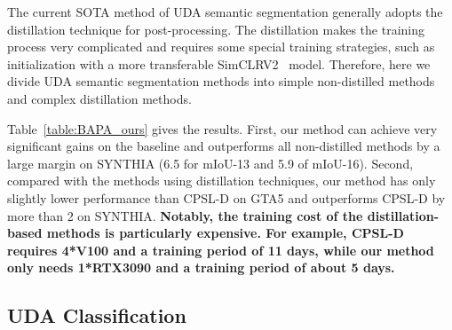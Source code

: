 The current SOTA method of UDA semantic segmentation generally adopts the distillation technique for post-processing. The distillation makes the training process very complicated and requires some special training strategies, such as initialization with a more transferable SimCLRV2~\cite{chen2020big} model. Therefore, here we divide UDA semantic segmentation methods into simple non-distilled methods and complex distillation methods.

Table~\ref{table:BAPA_ours} gives the results. First, our method can achieve very significant gains on the baseline and outperforms all non-distilled methods by a large margin on SYNTHIA (6.5 for mIoU-13 and 5.9 of mIoU-16). Second, compared with the methods using distillation techniques, our method has only slightly lower performance than CPSL-D on GTA5 and outperforms CPSL-D by more than 2 on SYNTHIA. \textbf{Notably, the training cost of the distillation-based methods is particularly expensive. For example, CPSL-D requires 4*V100 and a training period of 11 days, while our method only needs 1*RTX3090 and a training period of about 5 days.} 












\subsection{UDA Classification}
\label{app:ruda}

